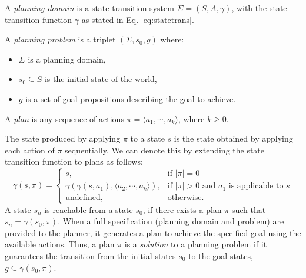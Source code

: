 
\begin{definition}
A \textit{planning domain} is a state transition system $\Sigma = (S, A, \gamma)$, with the state transition function $\gamma$ as stated in Eq. \ref{eq:statetrans}.
\end{definition}

\begin{definition}
A \textit{planning problem} is a triplet $(\Sigma, s_0, g)$ where:
\begin{itemize}
	\item $\Sigma$ is a planning domain,
	\item $s_0 \subseteq S$ is the initial state of the world,
	\item $g$ is a set of goal propositions describing the goal to achieve.
\end{itemize}
\end{definition}

\begin{definition}
	A \textit{plan} is any sequence of actions $\pi = \langle a_1,\cdots, a_k\rangle$, where $k\geq 0$. 
\end{definition}
The state produced by applying $\pi$ to a state $s$ is the state obtained by applying each action of $\pi$ sequentially. 
We can denote this by extending the state transition function to plans as follows:
\[\gamma(s,\pi)=\left\{
\begin{array}{ll}
s, &\mbox{if $|\pi|=0$} \\
\gamma(\gamma(s,a_1),\langle a_2,\cdots, a_k\rangle ), &\mbox{if $|\pi|>0$ and $a_1$ is applicable to $s$} \\
\mbox{undefined}, &\mbox{otherwise.}
\end{array}
\right.
\]
A state $s_n$ is reachable from a state $s_0$, if there exists a plan $\pi$ such that $s_{n} = \gamma(s_0, \pi)$.
When a full specification (\ie planning domain and problem) are provided to the planner, it generates a plan to achieve the specified goal using the available actions.
Thus, a plan $\pi$ is a \textit{solution} to a planning problem if it guarantees the transition from the initial states $s_0$ to the goal states, \ie $g \subseteq \gamma (s_0,\pi)$. 

